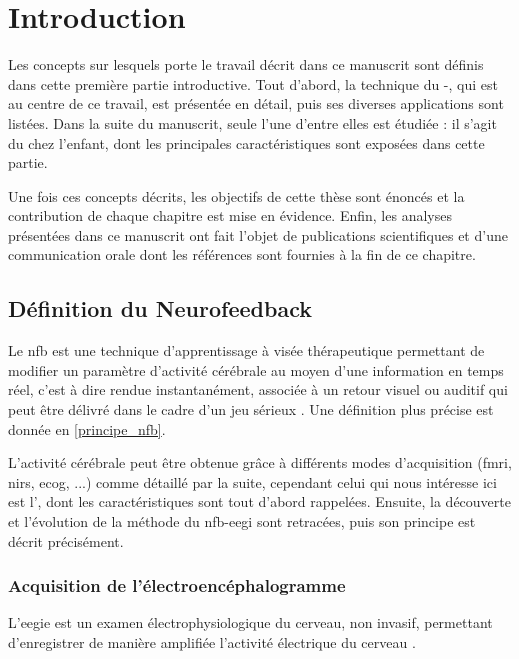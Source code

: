 \chapter{Introduction} \label{chapitre-1}

Les concepts sur lesquels porte le travail décrit dans ce manuscrit sont définis dans cette première partie introductive. Tout d'abord, la technique du -, 
qui est au centre de ce travail, est présentée en détail, puis ses diverses applications sont listées. Dans la suite du manuscrit, seule l'une d'entre elles est étudiée : 
il s'agit du  chez l'enfant, dont les principales caractéristiques sont exposées dans cette partie. 

Une fois ces concepts décrits, les objectifs de cette thèse sont énoncés et la contribution de chaque chapitre est mise en évidence. Enfin, les analyses 
présentées dans ce manuscrit ont fait l'objet de publications scientifiques et d'une communication orale dont les références sont fournies à la fin de ce chapitre. 

\newpage 

\section{Définition du Neurofeedback}

Le \gls{nfb} est une technique d’apprentissage à visée thérapeutique permettant de modifier un paramètre d’activité cérébrale au moyen d’une 
information en temps réel, c'est à dire rendue instantanément, associée à un retour visuel ou auditif \citep{Arns2014} qui peut être délivré
dans le cadre d'un jeu sérieux \citep{Wang2010}. Une définition plus précise est donnée en \ref{principe_nfb}.

L'activité cérébrale peut être obtenue grâce à différents modes d'acquisition (\gls{fmri}, \gls{nirs}, \gls{ecog}, ...) comme détaillé par la suite, 
cependant celui qui nous intéresse ici est l', dont les caractéristiques sont tout d'abord
rappelées. Ensuite, la découverte et l'évolution de la méthode du \gls{nfb}-\gls{eegi} sont retracées, puis son principe est décrit précisément.

\subsection{Acquisition de l'électroencéphalogramme} \label{eeg_definition}

L'\gls{eegie} est un examen électrophysiologique du cerveau, non invasif, permettant d’enregistrer de manière amplifiée l'activité électrique du cerveau \citep{Nunez2006}. 

